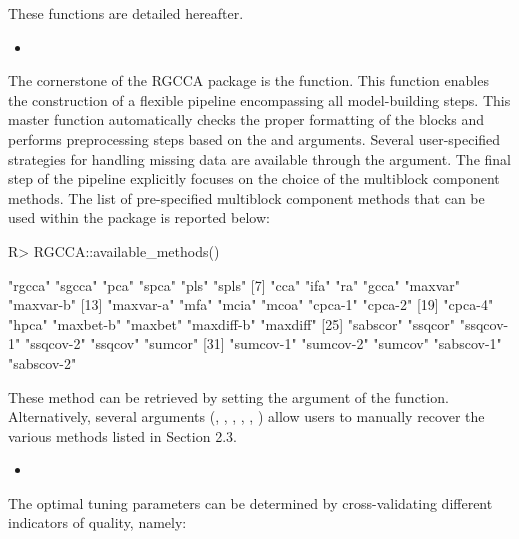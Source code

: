 \documentclass[
]{jss}
\begin{document}
These functions are detailed hereafter.

\begin{itemize}
\item
\end{itemize}

The cornerstone of the RGCCA package is the  function.
This function enables the construction of a flexible pipeline
encompassing all model-building steps. This master function
automatically checks the proper formatting of the blocks and performs
preprocessing steps based on the  and 
arguments. Several user-specified strategies for handling missing data
are available through the  argument. The final step of
the pipeline explicitly focuses on the choice of the multiblock
component methods. The list of pre-specified multiblock component
methods that can be used within the  package is reported
below:

\footnotesize

\begin{CodeChunk}
\begin{CodeInput}
R> RGCCA::available_methods()
\end{CodeInput}
\begin{CodeOutput}
 [1] "rgcca"     "sgcca"     "pca"       "spca"      "pls"       "spls"     
 [7] "cca"       "ifa"       "ra"        "gcca"      "maxvar"    "maxvar-b" 
[13] "maxvar-a"  "mfa"       "mcia"      "mcoa"      "cpca-1"    "cpca-2"   
[19] "cpca-4"    "hpca"      "maxbet-b"  "maxbet"    "maxdiff-b" "maxdiff"  
[25] "sabscor"   "ssqcor"    "ssqcov-1"  "ssqcov-2"  "ssqcov"    "sumcor"   
[31] "sumcov-1"  "sumcov-2"  "sumcov"    "sabscov-1" "sabscov-2"
\end{CodeOutput}
\end{CodeChunk}

\normalsize

These method can be retrieved by setting the  argument of
the  function. Alternatively, several arguments
(, , , ,
, ) allow users to manually recover the
various methods listed in Section 2.3.

\begin{itemize}
\item
\end{itemize}

The optimal tuning parameters can be determined by cross-validating
different indicators of quality, namely:
\end{document}
